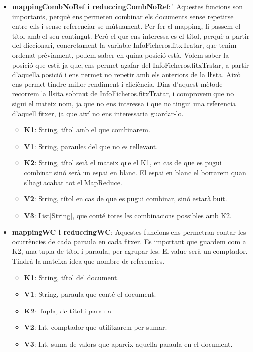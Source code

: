 \documentclass[11pt,a4paper]{article}
\begin{document}
\begin{itemize}
\begin{itemize}
			\item \textbf{mappingCombNoRef i reduccingCombNoRef}:´
Aquestes funcions son importants, perquè ens permeten combinar els documents sense repetirse entre ells i sense referenciar-se mútuament.
Per fer el mapping, li passem el títol amb el seu contingut. Però el que ens interessa es el títol, perquè a partir del diccionari, concretament la variable InfoFicheros.fitxTratar, que tenim ordenat prèviament, podem saber en quina posició està. Volem saber la posició que està ja que, ens permet agafar del InfoFicheros.fitxTratar, a partir d’aquella posició i ens permet no repetir amb els anteriors de la llista. Això ens permet tindre millor rendiment i eficiència. 
Dins d’aquest mètode recorrem la llsita sobrant de InfoFicheros.fitxTratar, i comprovem que no sigui el mateix nom, ja que no ens interessa i que no tingui una referencia d’aquell fitxer, ja que així no ens interessaria guardar-lo.
			\begin{itemize}
				\item \textbf{K1}: String, títol amb el que combinarem.
				\item \textbf{V1}: String, paraules del que no es rellevant.
				\item \textbf{K2}: String, títol serà el mateix que el K1, en cas de que es pugui combinar sinó serà  un espai en blanc. El espai en blanc el borrarem quan s’hagi acabat tot el MapReduce.
				\item \textbf{V2}: String, títol en cas de que es pugui combinar, sinó estarà buit.
				\item \textbf{V3}: List[String], que conté totes les combinacions possibles amb K2.
			\end{itemize}
			
			\item \textbf{mappingWC i reduccingWC}:
			Aquestes funcions ens permetran contar les ocurrències de cada paraula en cada fitxer. Es important que guardem com a K2, una tupla de títol i paraula, per agrupar-les. El value serà un comptador. Tindrà la mateixa idea que nombre de referencies.
			\begin{itemize}
				\item \textbf{K1}: String,  títol del document.
				\item \textbf{V1}: String, paraula que conté el document.
				\item \textbf{K2}: Tupla, de títol i paraula.
				\item \textbf{V2}: Int, comptador que utilitzarem per sumar.
				\item \textbf{V3}: Int, suma de valors que apareix aquella paraula en el document.
			\end{itemize}
			

\end{itemize}
\end{itemize}
\end{document}
